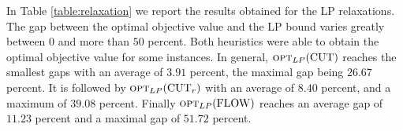 \begin{table}[H]
	\centering
	\caption{Gaps [\%] reached by the LP relaxations.}
	\label{table:relaxation}
\end{table}

In Table \ref{table:relaxation} we report the results obtained for the LP relaxations. The gap between the optimal objective value and the LP bound varies greatly between $0$ and more than $50$ percent. Both heuristics were able to obtain the optimal objective value for some instances. In general, $\textsc{opt}_{LP}(\mathrm{CUT})$ reaches the smallest gaps with an average of $3.91$ percent, the maximal gap being $26.67$ percent. It is followed by $\textsc{opt}_{LP}(\mathrm{CUT}_r)$ with an average of $8.40$ percent, and a maximum of $39.08$ percent. Finally $\textsc{opt}_{LP}(\mathrm{FLOW})$ reaches an average gap of $11.23$ percent and a maximal gap of $51.72$ percent.\medskip

